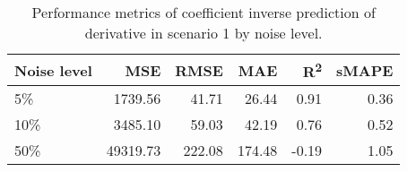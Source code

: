 \begin{table}[H]
  \caption{Performance metrics of coefficient inverse prediction of derivative in scenario 1 by noise level.}\label{table:scenario_1_inv_spectral_metrics}
  \centering
  \begin{tabular}{lrrrrr}
    \toprule
    Noise level & MSE      & RMSE   & MAE    & R\textsuperscript{2} & sMAPE \\
    \midrule
    5\%         & 1739.56  & 41.71  & 26.44  & 0.91                 & 0.36  \\
    10\%        & 3485.10  & 59.03  & 42.19  & 0.76                 & 0.52  \\
    50\%        & 49319.73 & 222.08 & 174.48 & -0.19                & 1.05  \\
    \bottomrule
  \end{tabular}
\end{table}

